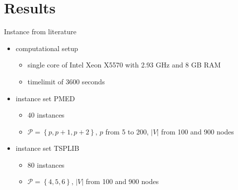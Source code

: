 \documentclass[utf8,aspectratio=169,ngerman,english]{beamer}
\renewcommand{\emph}[1]{\textcolor{jkuGreen}{#1}}
\begin{document}
\section{Results}
\begin{frame}{Instance from literature}
    \vspace*{-2pt}
    \begin{itemize}
        \item computational setup
        \begin{itemize}
            \item single core of Intel Xeon X5570 with 2.93 GHz and 8 GB RAM
            \item \emph{timelimit} of 3600 seconds
        \end{itemize}\pause
        \item instance set \emph{PMED} \cite{chen2009new,contardo2019scalable,calik2013double}
              \begin{itemize}
                \item 40 instances
                \item $\mathcal P = \left \{p, p+1, p+2\right \}$, $p$ from 5 to 200, $\left|V\right|$ from 100 and 900 nodes                  
              \end{itemize} \pause
        \item instance set \emph{TSPLIB} \cite{contardo2019scalable, GAAR2022}
              \begin{itemize}
                  \item 80 instances
                  \item $\mathcal P = \left \{4, 5, 6\right \}$, $\left|V\right|$ from 100 and 900 nodes
              \end{itemize}
    \end{itemize}
\end{frame}

\end{document}
